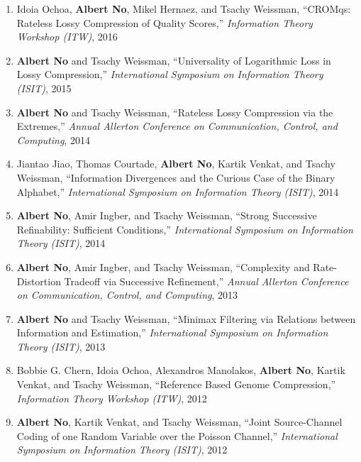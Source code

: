\documentclass[10pt]{article}
\begin{document}
\begin{enumerate}[(C1)]
\item Idoia Ochoa, {{\bf Albert No}}, Mikel Hernaez, and Tsachy Weissman,
``CROMqs: Rateless Lossy Compression of Quality Scores,''
{\it Information Theory Workshop (ITW)}, 2016\\

\item {{\bf Albert No}} and Tsachy Weissman,
``Universality of Logarithmic Loss in Lossy Compression,''
{\it International Symposium on Information Theory (ISIT)}, 2015\\

\item {{\bf Albert No}} and Tsachy Weissman,
``Rateless Lossy Compression via the Extremes,''
{\it Annual Allerton Conference on Communication, Control, and Computing}, 2014\\

\item Jiantao Jiao, Thomas Courtade, {{\bf Albert No}}, Kartik Venkat, and Tsachy Weissman,
``Information Divergences and the Curious Case of the Binary Alphabet,''
{\it International Symposium on Information Theory (ISIT)}, 2014\\

\item {{\bf Albert No}}, Amir Ingber, and Tsachy Weissman,
``Strong Successive Refinability: Sufficient Conditions,''
{\it International Symposium on Information Theory (ISIT)}, 2014\\

\item {{\bf Albert No}}, Amir Ingber, and Tsachy Weissman,
``Complexity and Rate-Distortion Tradeoff via Successive Refinement,''
{\it Annual Allerton Conference on Communication, Control, and Computing}, 2013\\

\item {{\bf Albert No}} and Tsachy Weissman,
``Minimax Filtering via Relations between Information and Estimation,''
{\it International Symposium on Information Theory (ISIT)}, 2013\\

\item Bobbie G. Chern, Idoia Ochoa, Alexandros Manolakos, {{\bf Albert No}}, Kartik Venkat, and Tsachy Weissman,
``Reference Based Genome Compression,''
{\it Information Theory Workshop (ITW)}, 2012\\

\item {{\bf Albert No}}, Kartik Venkat, and Tsachy Weissman,
``Joint Source-Channel Coding of one Random Variable over the Poisson Channel,''
{\it International Symposium on Information Theory (ISIT)}, 2012
\end{enumerate}
\end{document}
